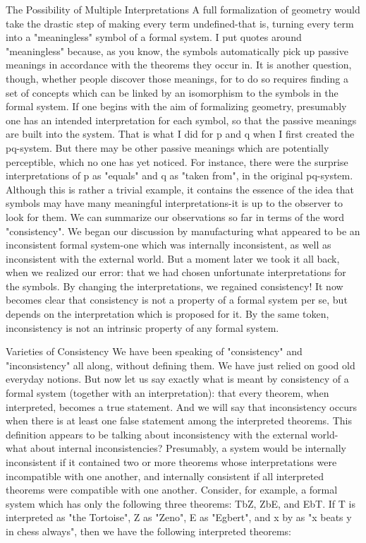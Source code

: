                    The Possibility of Multiple Interpretations
A full formalization of geometry would take the drastic step of making every term
undefined-that is, turning every term into a "meaningless" symbol of a formal system. I
put quotes around "meaningless" because, as you know, the symbols automatically pick
up passive meanings in accordance with the theorems they occur in. It is another
question, though, whether people discover those meanings, for to do so requires finding a
set of concepts which can be linked by an isomorphism to the symbols in the formal
system. If one begins with the aim of formalizing geometry, presumably one has an
intended interpretation for each symbol, so that the passive meanings are built into the
system. That is what I did for p and q when I first created the pq-system.
        But there may be other passive meanings which are potentially perceptible, which
no one has yet noticed. For instance, there were the surprise interpretations of p as
"equals" and q as "taken from", in the original pq-system. Although this is rather a trivial
example, it contains the essence of the idea that symbols may have many meaningful
interpretations-it is up to the observer to look for them.
        We can summarize our observations so far in terms of the word "consistency".
We began our discussion by manufacturing what appeared to be an inconsistent formal
system-one which was internally inconsistent, as well as inconsistent with the external
world. But a moment later we took it all back, when we realized our error: that we had
chosen unfortunate interpretations for the symbols. By changing the interpretations, we
regained consistency! It now becomes clear that consistency is not a property of a formal
system per se, but depends on the interpretation which is proposed for it. By the same
token, inconsistency is not an intrinsic property of any formal system.

                              Varieties of Consistency
       We have been speaking of "consistency" and "inconsistency" all along, without
defining them. We have just relied on good old everyday notions. But now let us say
exactly what is meant by consistency of a formal system (together with an interpretation):
that every theorem, when interpreted, becomes a true statement. And we will say that
inconsistency occurs when there is at least one false statement among the interpreted
theorems.
       This definition appears to be talking about inconsistency with the external world-
what about internal inconsistencies? Presumably, a system would be internally
inconsistent if it contained two or more theorems whose interpretations were
incompatible with one another, and internally consistent if all interpreted theorems were
compatible with one another. Consider, for example, a formal system which has only the
following three theorems: TbZ, ZbE, and EbT. If T is interpreted as "the Tortoise", Z as
"Zeno", E as "Egbert", and x by as "x beats y in chess always", then we have the
following interpreted theorems:




